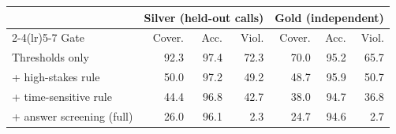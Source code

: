 \begin{tabular}{lrrrrrr}
\toprule
 & \multicolumn{3}{c}{Silver (held-out calls)} & \multicolumn{3}{c}{Gold (independent)} \\
\cmidrule(lr){2-4}\cmidrule(lr){5-7}
Gate & Cover. & Acc. & Viol. & Cover. & Acc. & Viol. \\
\midrule
Thresholds only & 92.3 & 97.4 & 72.3 & 70.0 & 95.2 & 65.7 \\
+ high-stakes rule & 50.0 & 97.2 & 49.2 & 48.7 & 95.9 & 50.7 \\
+ time-sensitive rule & 44.4 & 96.8 & 42.7 & 38.0 & 94.7 & 36.8 \\
+ answer screening (full) & 26.0 & 96.1 & 2.3 & 24.7 & 94.6 & 2.7 \\
\bottomrule
\end{tabular}